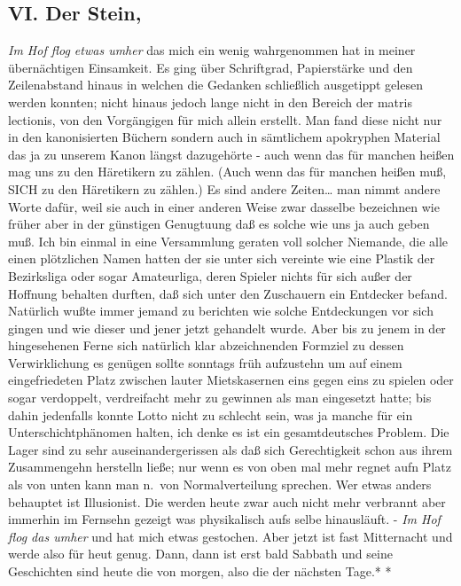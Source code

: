\documentclass[
]{article}
\author{}
\date{\vspace{-2.5em}}
\begin{document}
\subsection{VI. Der Stein,}\label{vi.-der-stein}

\emph{Im Hof flog etwas umher} das mich ein wenig wahrgenommen hat in
meiner übernächtigen Einsamkeit. Es ging über Schriftgrad, Papierstärke
und den Zeilenabstand hinaus in welchen die Gedanken schließlich
ausgetippt gelesen werden konnten; nicht hinaus jedoch lange nicht in
den Bereich der matris lectionis, von den Vorgängigen für mich allein
erstellt. Man fand diese nicht nur in den kanonisierten Büchern sondern
auch in sämtlichem apokryphen Material das ja zu unserem Kanon längst
dazugehörte - auch wenn das für manchen heißen mag uns zu den Häretikern
zu zählen. (Auch wenn das für manchen heißen muß, SICH zu den Häretikern
zu zählen.) Es sind andere Zeiten\ldots{} man nimmt andere Worte dafür,
weil sie auch in einer anderen Weise zwar dasselbe bezeichnen wie früher
aber in der günstigen Genugtuung daß es solche wie uns ja auch geben
muß. Ich bin einmal in eine Versammlung geraten voll solcher Niemande,
die alle einen plötzlichen Namen hatten der sie unter sich vereinte wie
eine Plastik der Bezirksliga oder sogar Amateurliga, deren Spieler
nichts für sich außer der Hoffnung behalten durften, daß sich unter den
Zuschauern ein Entdecker befand. Natürlich wußte immer jemand zu
berichten wie solche Entdeckungen vor sich gingen und wie dieser und
jener jetzt gehandelt wurde. Aber bis zu jenem in der hingesehenen Ferne
sich natürlich klar abzeichnenden Formziel zu dessen Verwirklichung es
genügen sollte sonntags früh aufzustehn um auf einem eingefriedeten
Platz zwischen lauter Mietskasernen eins gegen eins zu spielen oder
sogar verdoppelt, verdreifacht mehr zu gewinnen als man eingesetzt
hatte; bis dahin jedenfalls konnte Lotto nicht zu schlecht sein, was ja
manche für ein Unterschichtphänomen halten, ich denke es ist ein
gesamtdeutsches Problem. Die Lager sind zu sehr auseinandergerissen als
daß sich Gerechtigkeit schon aus ihrem Zusammengehn herstelln ließe; nur
wenn es von oben mal mehr regnet aufn Platz als von unten kann man
n.~von Normalverteilung sprechen. Wer etwas anders behauptet ist
Illusionist. Die werden heute zwar auch nicht mehr verbrannt aber
immerhin im Fernsehn gezeigt was physikalisch aufs selbe hinausläuft. -
\emph{Im Hof flog das umher} und hat mich etwas gestochen. Aber jetzt
ist fast Mitternacht und werde also für heut genug. Dann, dann ist erst
bald Sabbath und seine Geschichten sind heute die von morgen, also die
der nächsten Tage.* *
\end{document}

